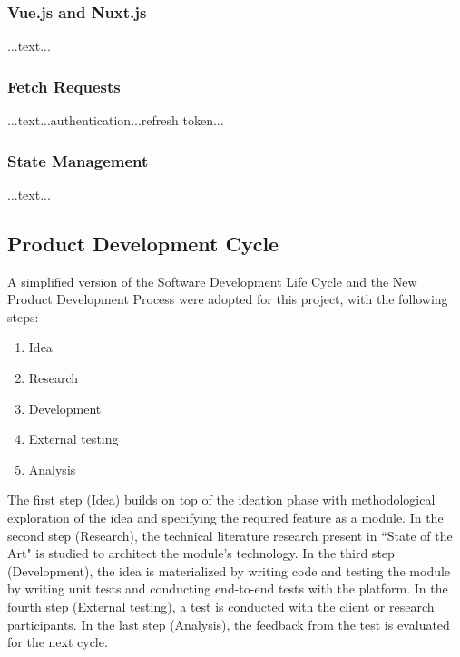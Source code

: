 \documentclass{article}
\begin{document}
\subsubsection{Vue.js and Nuxt.js}

...text...

\subsubsection{Fetch Requests}

...text...authentication...refresh token...

\subsubsection{State Management}

...text...

\subsection{Product Development Cycle}

A simplified version of the Software Development Life Cycle and the New Product Development Process were adopted for this project, with the following steps:

\begin{enumerate}
	\item Idea
	\item Research
	\item Development
	\item External testing
	\item Analysis
\end{enumerate}

The first step (Idea) builds on top of the ideation phase with methodological exploration of the idea and specifying the required feature as a module. In the second step (Research), the technical literature research present in ``State of the Art" is studied to architect the module's technology. In the third step (Development), the idea is materialized by writing code and testing the module by writing unit tests and conducting end-to-end tests with the platform. In the fourth step (External testing), a test is conducted with the client or research participants. In the last step (Analysis), the feedback from the test is evaluated for the next cycle.
\end{document}
